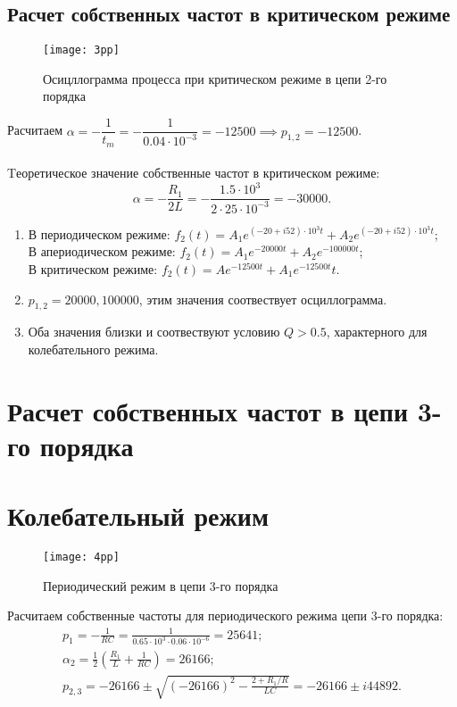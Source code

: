 \documentclass[a4paper,14pt ]{article} %
\begin{document}
\subsection{Расчет собственных частот в критическом режиме}
\begin{figure}[H]
    \texttt{[image: 3pp]}
    \centering
    \caption{Осицллограмма процесса при критическом режиме в цепи 2-го порядка}
\end{figure}
Расчитаем $\alpha = -\dfrac1{t_m} = -\dfrac1{0.04\cdot10^{-3}}= -12500 \implies p_{1,2} = -12500$. 
\\\\ \indent Tеоретическое значение собственные частот в критическом режиме:
\begin{equation*}
    \alpha = -\frac{R_1}{2L} = -\frac{1.5\cdot10^3}{2\cdot25\cdot10^{-3}} = -30000.
\end{equation*}
\begin{enumerate}
    \item В периодическом режиме: $f_2(t) = A_1e^{(-20 + i52)\cdot 10^3t} + A_2e^{(-20 + i52)\cdot 10^3t}$;
    \\В апериодическом режиме: $f_2(t) = A_1e^{-20000t} + A_2e^{-100000t}$;
    \\В критическом режиме: $f_2(t) = Ae^{-12500t} + A_1e^{-12500t}t$.
    \item $p_{1,2} = 20000, 100000$, этим значения соотвествует осциллограмма.
    \item Оба значения близки и соотвествуют условию $Q > 0.5$, характерного для колебательного режима.
 \end{enumerate}    
\section{Расчет собственных частот в цепи 3-го порядка}
\section{Колебательный режим} 
\begin{figure}[H]
    \texttt{[image: 4pp]}
    \centering
    \caption{Периодический режим в цепи 3-го порядка}
\end{figure}
Расчитаем собственные частоты для периодического режима цепи 3-го порядка:
\begin{multline*}
    p_1 = -\frac{1}{RC} = \frac{1}{0.65\cdot10^3\cdot0.06\cdot10^{-6}} = 25641;
\\ \alpha_2 = \frac12\left(\frac{R_1}L + \frac1{RC}\right) = 26166;
\\ 
p_{2,3} = -26166 \pm \sqrt{(-26166)^2 - \frac{2 + R_1/R}{LC}}= -26166 \pm i44892.
\end{multline*}
\end{document}
